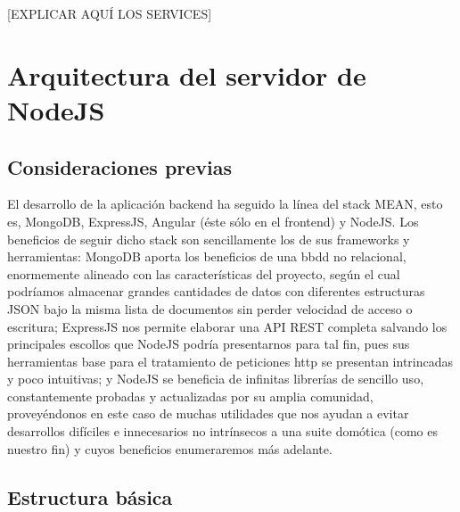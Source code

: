 [EXPLICAR AQUÍ LOS SERVICES]

\section{Arquitectura del servidor de NodeJS}
\label{makereference4.7}

\subsection{Consideraciones previas}
\label{makereference4.7.1}

El desarrollo de la aplicación backend ha seguido la línea del stack MEAN, esto es, MongoDB, ExpressJS, Angular (éste sólo en el frontend) y NodeJS. Los beneficios de seguir dicho stack son sencillamente los de sus frameworks y herramientas: MongoDB aporta los beneficios de una \gls{bbdd} no relacional, enormemente alineado con las características del proyecto, según el cual podríamos almacenar grandes cantidades de datos con diferentes estructuras JSON bajo la misma lista de documentos sin perder velocidad de acceso o escritura; ExpressJS nos permite elaborar una API REST completa salvando los principales escollos que NodeJS podría presentarnos para tal fin, pues sus herramientas base para el tratamiento de peticiones http se presentan intrincadas y poco intuitivas; y NodeJS se beneficia de infinitas librerías de sencillo uso, constantemente probadas y actualizadas por su amplia comunidad, proveyéndonos en este caso de muchas utilidades que nos ayudan a evitar desarrollos difíciles e innecesarios no intrínsecos a una suite domótica (como es nuestro fin) y cuyos beneficios enumeraremos más adelante.

\subsection{Estructura básica}
\label{makereference4.7.2}

